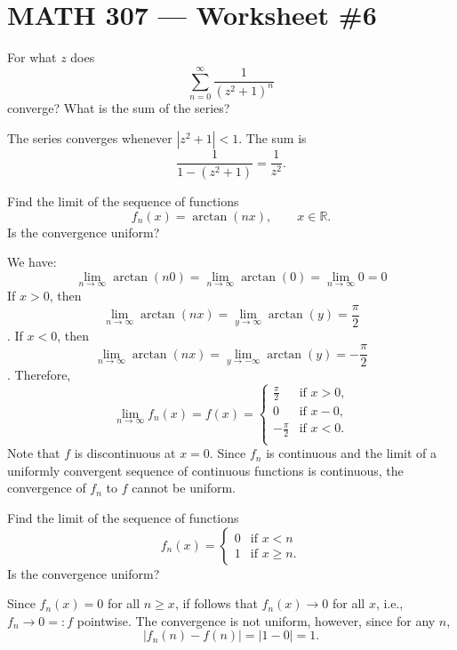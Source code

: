 \documentclass[12pt, answers]{exam}
\newcommand{\RR}{\mathbb{R}}
\begin{document}
\section*{MATH 307 --- Worksheet \#6 }

\bigskip
\begin{questions}
    \setlength\itemsep{1em}
    \setlength\parskip{1em}

    \question
    For what $z$ does $$\sum_{n=0}^\infty \frac1{(z^2+1)^n}$$ converge? What is the sum of the series?

    \begin{solution}
        The series converges whenever $|z^2+1| < 1$. The sum is
        $$
        \frac1{1 - (z^2+1)}=\frac1{z^2}.
        $$
    \end{solution}
    
    \question
    Find the limit of the sequence of functions
    \[
        f_n(x) = \arctan(nx),\qquad x\in\RR.
    \]
    Is the convergence uniform?

    \begin{solution} We have:
        $$\lim_{n\to\infty}\arctan(n0) = \lim_{n\to\infty} \arctan(0) = \lim_{n\to\infty} 0=0$$
        If $x>0$, then
        $$\lim_{n\to\infty} \arctan(nx) = \lim_{y\to\infty} \arctan(y) = \frac\pi2$$.
        If $x<0$, then 
        $$\lim_{n\to\infty} \arctan(nx) = \lim_{y\to-\infty} \arctan(y) = -\frac\pi2$$.
        Therefore,
        $$\lim_{n\to\infty}f_n(x)=f(x)=\begin{cases}
            \frac\pi2&\text{if $x>0$,}\\
            0&\text{if $x-0$,}\\
            -\frac\pi2&\text{if $x<0$.}\\
        \end{cases}$$
        Note that $f$ is discontinuous at $x=0$. Since $f_n$ is continuous and the limit of a
        uniformly convergent sequence of continuous functions is continuous,
        the convergence of $f_n$ to $f$ cannot be uniform.
    \end{solution}

    \question
    Find the limit of the sequence of functions
    \[
        f_n(x) = \begin{cases}
            0&\text{if $x< n$}\\
            1&\text{if $x\geq n$.}
        \end{cases}
    \]
    Is the convergence uniform?
    
    \begin{solution}
        Since $f_n(x)=0$ for all $n\geq x$, if follows that $f_n(x)\to 0$ for all $x$,
        i.e., $f_n\to 0=:f$ pointwise. The convergence is not uniform, however, since for any $n$,
        $$|f_n(n) - f(n)|=|1-0|=1.$$
    \end{solution}


\end{questions}
\end{document}
